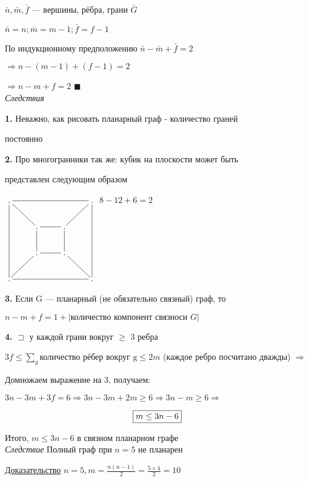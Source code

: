 \documentclass[a4paper, 12pt] {article}
\begin{document}
$ \bar n, \bar m, \bar f$ --- вершины, рёбра, грани $ \bar G $

$ \bar n = n; \bar m = m-1; \bar f = f-1$

По индукционному предположению $ \bar n - \bar m + \bar f =2$

$ \Rightarrow n-(m-1)+(f-1)=2 $

$ \Rightarrow n-m+f=2 $ $ \blacksquare $\\

\textit{Следствия}

\textbf{1.} Неважно, как рисовать планарный граф - количество граней 

постоянно

\textbf{2.} Про многогранники так же: кубик на плоскости может быть 

представлен следующим образом

$\xymatrix{
. \ar@{-}[rrr] \ar@{-}[ddd] \ar@{-}[rd] & & & . \\
& . \ar@{-}[r] \ar@{-}[d] & . \ar@{-}[ru] & \\
& . & . \ar@{-}[l] \ar@{-}[u] \ar@{-}[rd] &  \\
. \ar@{-}[ru] & & & . \ar@{-}[lll] \ar@{-}[uuu] \\
}$ $ 8-12+6=2 $

\textbf{3.} Если G --- планарный (не обязательно связный) граф, то 

$ n-m+f=1+ |\text{количество компонент связноси } G| $

\textbf{4.} $ \sqsupset$ у каждой грани вокруг $ \ge $ 3 ребра

$ 3f \le \sum_g \text{количество рёбер вокруг g} \le	2m$ (каждое ребро посчитано дважды) $ \Rightarrow $ \begin{center}
\end{center}

Домножаем выражение  на 3, получаем: 

$ 3n-3m+3f=6 \Rightarrow 3n-3m+2m \ge 6 \Rightarrow 3n-m \ge 6 \Rightarrow$

\begin{equation}\label{eq1}
	\fbox{$ m \le 3n-6 $}
\end{equation}

Итого, $ m \le 3n-6 $ в связном планарном графе\\


\textit{Следствие} Полный граф при $ n = 5 $ не планарен

\underline{Доказательство} $ n = 5, m = \frac{n(n-1)}{2} = \frac{5 \times 4}{2} = 10$
\end{document}
